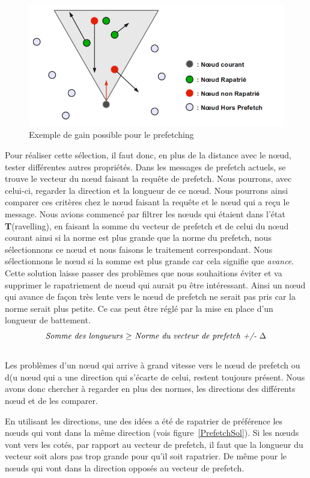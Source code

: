 	\begin{figure}[!h]
        \centering
        \includegraphics[scale=0.45]{./Ressources/Images/prefetchaV1.png}
        \caption{Exemple de gain possible pour le prefetching}
        \label{prefetchav}
        \end{figure}

\par Pour réaliser cette sélection, il faut donc, en plus de la distance avec le nœud, tester différentes autres propriétés. Dans les messages de prefetch actuels, se trouve le vecteur du nœud faisant la requête de prefetch. Nous pourrons, avec celui-ci, regarder la direction et la longueur de ce nœud. Nous pourrons ainsi comparer ces critères chez le nœud faisant la requête et le nœud qui a reçu le message. Nous avions commencé par filtrer les nœuds qui étaient dans l'état \textbf{T}(ravelling), en faisant la somme du vecteur de prefetch et de celui du nœud courant ainsi si la norme est plus grande que la norme du prefetch, nous sélectionnons ce nœud et nous faisons le traitement correspondant. Nous sélectionnons le nœud si la somme est plus grande car cela signifie que \textit{avance}. Cette solution laisse passer des problèmes que nous souhaitions éviter et va supprimer le rapatriement de nœud qui aurait pu être intéressant. Ainsi un nœud qui avance de façon très lente vers le nœud de prefetch ne serait pas pris car la norme serait plus petite. Ce cas peut être réglé par la mise en place d'un longueur de battement.
\newline
$$\\\textit{Somme des longueurs~$\ge$~Norme du vecteur de prefetch +/- $\Delta$}$$
\\Les problèmes d'un nœud qui arrive à grand vitesse vers le nœud de prefetch ou d(u nœud qui a une direction qui s'écarte de celui, restent toujours présent. Nous avons donc chercher à regarder en plus des normes, les directions des différents nœud et de les comparer.
\par En utilisant les directions, une des idées a été de rapatrier de préférence les nœuds qui vont dans la même direction (vois figure~\ref{PrefetchSol}). Si les nœuds vont vers les cotés, par rapport au vecteur de prefetch, il faut que la longueur du vecteur soit alors pas trop grande pour qu'il soit rapatrier. De même pour le nœuds qui vont dans la direction opposés au vecteur de prefetch.

